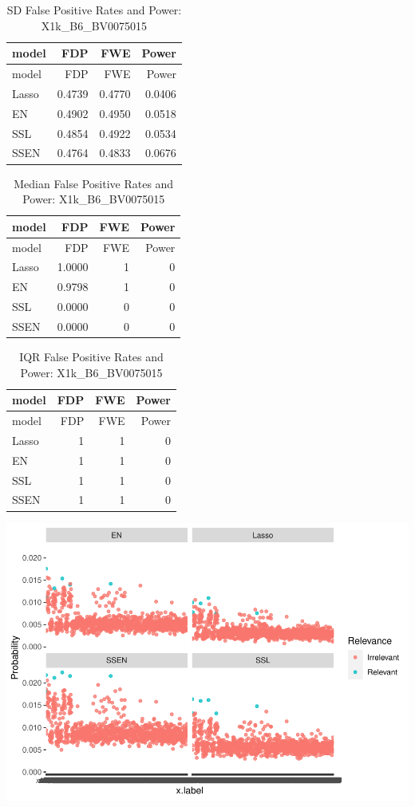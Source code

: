 \documentclass[
]{article}
\begin{document}
\begin{longtable}[]{@{}lrrr@{}}
\caption{SD False Positive Rates and Power:
X1k\_B6\_BV0075015}\tabularnewline
\toprule
model & FDP & FWE & Power \\
\midrule
\endfirsthead
\toprule
model & FDP & FWE & Power \\
\midrule
\endhead
Lasso & 0.4739 & 0.4770 & 0.0406 \\
EN & 0.4902 & 0.4950 & 0.0518 \\
SSL & 0.4854 & 0.4922 & 0.0534 \\
SSEN & 0.4764 & 0.4833 & 0.0676 \\
\bottomrule
\end{longtable}

\begin{longtable}[]{@{}lrrr@{}}
\caption{Median False Positive Rates and Power:
X1k\_B6\_BV0075015}\tabularnewline
\toprule
model & FDP & FWE & Power \\
\midrule
\endfirsthead
\toprule
model & FDP & FWE & Power \\
\midrule
\endhead
Lasso & 1.0000 & 1 & 0 \\
EN & 0.9798 & 1 & 0 \\
SSL & 0.0000 & 0 & 0 \\
SSEN & 0.0000 & 0 & 0 \\
\bottomrule
\end{longtable}

\begin{longtable}[]{@{}lrrr@{}}
\caption{IQR False Positive Rates and Power:
X1k\_B6\_BV0075015}\tabularnewline
\toprule
model & FDP & FWE & Power \\
\midrule
\endfirsthead
\toprule
model & FDP & FWE & Power \\
\midrule
\endhead
Lasso & 1 & 1 & 0 \\
EN & 1 & 1 & 0 \\
SSL & 1 & 1 & 0 \\
SSEN & 1 & 1 & 0 \\
\bottomrule
\end{longtable}

\includegraphics{simulation_results_files/figure-latex/unnamed-chunk-10-1.pdf}
\end{document}

